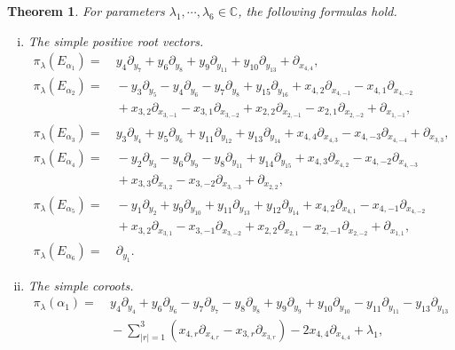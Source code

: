 \documentclass[12pt]{article}
\numberwithin{equation}{section}
\newtheorem{theorem}{Theorem}[section]
\theoremstyle{definition}
\theoremstyle{remark}
\begin{document}
\begin{theorem}\label{thm3.2}
	For parameters $\lambda_1,\cdots,\lambda_6\in\mathbb{C}$, the following formulas hold.
	\begin{enumerate}[(i)]
		\item The simple positive root vectors.
		\begin{align}
			\pi_{\lambda}(E_{\alpha_1})=&\:y_4\partial_{y_7}+y_6\partial_{y_8}+y_9\partial_{y_{11}}+y_{10}\partial_{y_{13}}+\partial_{x_{4,4}},\label{3.91}\\
			\pi_{\lambda}(E_{\alpha_2})=&\:-y_3\partial_{y_5}-y_4\partial_{y_6}-y_7\partial_{y_8}+y_{15}\partial_{y_{16}}+x_{4,2}\partial_{x_{4,-1}}-x_{4,1}\partial_{x_{4,-2}}\nonumber\\
			&\:+x_{3,2}\partial_{x_{3,-1}}-x_{3,1}\partial_{x_{3,-2}}+x_{2,2}\partial_{x_{2,-1}}-x_{2,1}\partial_{x_{2,-2}}+\partial_{x_{1,-1}},\label{ea2}\\
			\pi_{\lambda}(E_{\alpha_3})=&\:y_3\partial_{y_4}+y_5\partial_{y_6}+y_{11}\partial_{y_{12}}+y_{13}\partial_{y_{14}}+x_{4,4}\partial_{x_{4,3}}-x_{4,-3}\partial_{x_{4,-4}}+\partial_{x_{3,3}},\label{ea3}\\
			\pi_{\lambda}(E_{\alpha_4})=&\:-y_2\partial_{y_3}-y_6\partial_{y_9}-y_8\partial_{y_{11}}+y_{14}\partial_{y_{15}}+x_{4,3}\partial_{x_{4,2}}-x_{4,-2}\partial_{x_{4,-3}}\nonumber\\
			&\:+x_{3,3}\partial_{x_{3,2}}-x_{3,-2}\partial_{x_{3,-3}}+\partial_{x_{2,2}},\label{ea4}\\
			\pi_{\lambda}(E_{\alpha_5})=&\:-y_1\partial_{y_2}+y_9\partial_{y_{10}}+y_{11}\partial_{y_{13}}+y_{12}\partial_{y_{14}}+x_{4,2}\partial_{x_{4,1}}-x_{4,-1}\partial_{x_{4,-2}}\nonumber\\
			&\:+x_{3,2}\partial_{x_{3,1}}-x_{3,-1}\partial_{x_{3,-2}}+x_{2,2}\partial_{x_{2,1}}-x_{2,-1}\partial_{x_{2,-2}}+\partial_{x_{1,1}},\label{3.95}\\
			\pi_{\lambda}(E_{\alpha_6})=&\:\partial_{y_1}.\label{3.96}
		\end{align}
		\item The simple coroots.
		\begin{align}
			\pi_{\lambda}(\alpha_1)=&\:y_4\partial_{y_4}+y_6\partial_{y_6}-y_7\partial_{y_7}-y_8\partial_{y_8}+y_9\partial_{y_9}+y_{10}\partial_{y_{10}}-y_{11}\partial_{y_{11}}-y_{13}\partial_{y_{13}}\nonumber \\
			&\:-\mathop{\textstyle\sum}\limits_{|r|=1}^3(x_{4,r}\partial_{x_{4,r}}-x_{3,r}\partial_{x_{3,r}})-2x_{4,4}\partial_{x_{4,4}}+\lambda_1,\label{3.97}\\

\end{align}
\end{enumerate}
\end{theorem}
\end{document}
